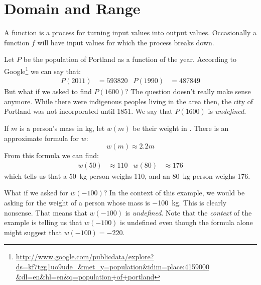 \begin{exercises}
\end{exercises}


\section{Domain and Range}

A function is a process for turning input values into output values. Occasionally a function $f$ will have input values for which the process breaks down.

\begin{pccexample}\label{fun:ex:portlandpop}
Let $P$ be the population of Portland as a function of the year. According to Google\footnote{\href{http://www.google.com/publicdata/explore?ds=kf7tgg1uo9ude_&met_y=population&idim=place:4159000&dl=en&hl=en&q=population+of+portland}{http://www.google.com/publicdata/explore?ds=kf7tgg1uo9ude\_\&met\_y=population\&idim=place:4159000 \&dl=en\&hl=en\&q=population+of+portland}} we can say that: 
\begin{align*}
	P(2011) & = \num{593820} & P(1990) & = \num{487849} 
\end{align*}
But what if we asked to find $P(1600)$? The question doesn't really make sense anymore. While there were indigenous peoples living in the area then, the city of Portland was not incorporated until 1851. We say that $P(1600)$ is \emph{undefined}.
\end{pccexample}

\begin{pccexample}\label{fun:ex:MassWeight}
If $m$ is a person's mass in \si{\kilo\gram}, let $w(m)$ be their weight in \si{\pound}. There is an approximate formula for $w$: 
\[
w(m)\approx 2.2m
\] 
From this formula we can find: 
\begin{align*}
	w(50) & \approx \num{110} & w(80) & \approx \num{176} 
\end{align*}
which tells us that a \SI[number-unit-product=-]{50}{\kilo\gram} person weighs \SI{110}{\pound}, and an \SI[number-unit-product=-]{80}{\kilo\gram} person weighs \SI{176}{\pound}.

What if we asked for $w(-100)$? In the context of this example, we would be asking for the weight of a person whose mass is \SI{-100}{\kilo\gram}. This is clearly nonsense. That means that $w(-100)$ is \emph{undefined}. Note that the \emph{context} of the example is telling us that $w(-100)$ is undefined even though the formula alone might suggest that $w(-100)=-220$.
\end{pccexample}

